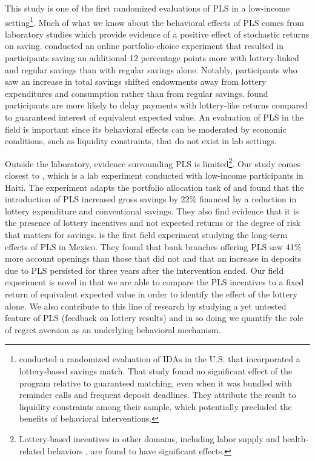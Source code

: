 \documentclass[11pt]{article}
\begin{document}
	This study is one of the first randomized evaluations of PLS in a low-income setting\footnote{\textcite{loibl_testing_2016} conducted a randomized evaluation of IDAs in the U.S. that incorporated a lottery-based savings match. That study found no significant effect of the program relative to guaranteed matching, even when it was bundled with reminder calls and frequent deposit deadlines. They attribute the result to liquidity constraints among their sample, which potentially precluded the benefits of behavioral interventions.}. Much of what we know about the behavioral effects of PLS comes from laboratory studies which provide evidence of a positive effect of stochastic returns on saving. \textcite{atalay_savings_2014} conducted an online portfolio-choice experiment that resulted in participants saving an additional 12 percentage points more with lottery-linked and regular savings than with regular savings alone. Notably, participants who saw an increase in total savings shifted endowments away from lottery expenditures and consumption rather than from regular savings. \textcite{filiz-ozbay_lottery_2015} found participants are more likely to delay payments with lottery-like returns compared to guaranteed interest of equivalent expected value. An evaluation of PLS in the field is important since its behavioral effects can be moderated by economic conditions, such as liquidity constraints, that do not exist in lab settings.


	Outside the laboratory, evidence surrounding PLS is limited\footnote{Lottery-based incentives in other domains, including labor supply \parencite{brune_effect_2015} and health-related behaviors \parencite{kimmel_randomized_2012,bjorkman_nyqvist_using_2015}, are found to have significant effects.}. Our study comes closest to \textcite{dizon_leveraging_2016}, which is a lab experiment conducted with low-income participants in Haiti. The experiment adapts the portfolio allocation task of \textcite{atalay_savings_2014} and found that the introduction of PLS increased gross savings by 22\% financed by a reduction in lottery expenditure and conventional savings. They also find evidence that it is the presence of lottery incentives and not expected returns or the degree of risk that matters for savings. \textcite{gertler_long-term_2017} is the first field experiment studying the long-term effects of PLS in Mexico. They found that bank branches offering PLS saw 41\% more account openings than those that did not and that an increase in deposits due to PLS persisted for three years after the intervention ended. Our field experiment is novel in that we are able to compare the PLS incentives to a fixed return of equivalent expected value in order to identify the effect of the lottery alone. We also contribute to this line of research by studying a yet untested feature of PLS (feedback on lottery results) and in so doing we quantify the role of regret aversion as an underlying behavioral mechanism.
\end{document}
